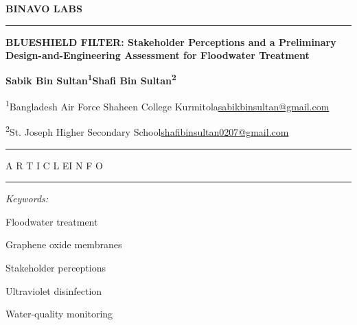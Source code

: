 \documentclass{ieeeaccess}
\begin{document}
\onecolumn
\thispagestyle{binavo}
\vspace*{-27pt}
{\noindent\hfill\normalfont\sffamily\bfseries\fontsize{18}{21}\selectfont\color{black} BINAVO LABS\par}
\vspace{5pt}\noindent\rule{\textwidth}{0.4pt}\par
\vspace{17pt}
{\noindent\raggedright\normalfont\bfseries\fontsize{20}{23}\selectfont
BLUESHIELD FILTER: Stakeholder Perceptions and a Preliminary Design-and-Engineering Assessment for Floodwater Treatment\par}
\vspace{15pt}
{\centering\normalfont\bfseries\fontsize{12}{15}\selectfont Sabik Bin Sultan\textsuperscript{1}\hspace{1.2em}Shafi Bin Sultan\textsuperscript{2}\par}
\vspace{5pt}
{\centering\normalfont\fontsize{10}{13}\selectfont
\textsuperscript{1}Bangladesh Air Force Shaheen College Kurmitola\enspace\textbar\enspace\href{mailto:sabikbinsultan@gmail.com}{sabikbinsultan@gmail.com}\par}
\vspace{5pt}
{\centering\normalfont\fontsize{10}{13}\selectfont
\textsuperscript{2}St. Joseph Higher Secondary School\enspace\textbar\enspace\href{mailto:shafibinsultan0207@gmail.com}{shafibinsultan0207@gmail.com}\par}
\vspace{20pt}
\noindent\rule{\textwidth}{0.45pt}\par\vspace{10pt}
\noindent\begin{minipage}[t]{0.255\textwidth}
\vspace{0pt}
{\normalfont\fontsize{9}{11}\selectfont A R T I C L E\quad I N F O\par}
\vspace{5pt}\hrule\vspace{7pt}
{\normalfont\fontsize{9}{12}\selectfont
\textit{Keywords:}\par
Floodwater treatment\par
Graphene oxide membranes\par
Stakeholder perceptions\par
Ultraviolet disinfection\par
Water-quality monitoring\par}
\end{minipage}\hfill
\end{document}
